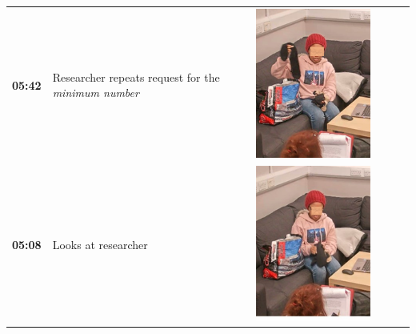 \documentclass[twocolumn, issue, empirical, authordate,drafn]{jote-new-article}
\begin{document}
\begin{table}[ht!]
\begin{tabularx}{\linewidth}{@{} m{.05\linewidth} m{.2\linewidth} >{\raggedleft\arraybackslash}m{.19\linewidth}  m{.05\linewidth} m{.2\linewidth} >{\raggedleft\arraybackslash}m{.19\linewidth} }
 \textbf{05:42} & Researcher repeats request for the \emph{minimum number} & \includegraphics[height=.15\textheight, width=.8\linewidth]{media/image11.png} \\ 
 \textbf{05:08} & Looks at researcher & \includegraphics[height=.15\textheight, width=.8\linewidth]{media/image7.png} &

\end{tabularx}
\end{table}
\end{document}
